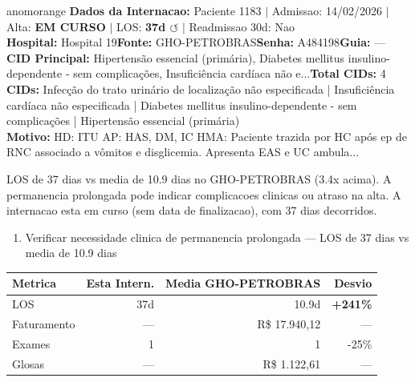 \documentclass[a4paper,10pt]{article}
\begin{document}
\begin{anomalycard}[Internacao 165684 | GHO-PETROBRAS | ALTO (z=4.22)]{anomorange}
\textbf{Dados da Internacao:} Paciente 1183 $\mid$ Admissao: 14/02/2026 $\mid$ Alta: \textcolor{anomorange}{\textbf{EM CURSO}} $\mid$ LOS: \textbf{37d \textcolor{anomorange}{$\circlearrowleft$}} $\mid$ Readmissao 30d: Nao\\
\textbf{Hospital:} Hospital 19\quad\textbf{Fonte:} GHO-PETROBRAS\quad\textbf{Senha:} A484198\quad\textbf{Guia:} ---\\
\textbf{CID Principal:} {\small Hipertensão essencial (primária), Diabetes mellitus insulino-dependente - sem complicações, Insuficiência cardíaca não e...}\quad\textbf{Total CIDs:} 4\\

\textbf{CIDs:} {\scriptsize Infecção do trato urinário de localização não especificada | Insuficiência cardíaca não especificada | Diabetes mellitus insulino-dependente - sem complicações | Hipertensão essencial (primária)}\\

\textbf{Motivo:} {\scriptsize HD: ITU AP: HAS, DM, IC HMA: Paciente trazida por HC após ep de RNC associado a vômitos e disglicemia. Apresenta EAS e UC ambula...}\\

\vspace{2pt}\begin{tcolorbox}[colback=severityred!20,colframe=anomorange,title={\textbf{Interpretacao de Negocio}},fonttitle=\bfseries\small,left=4pt,right=4pt,top=3pt,bottom=3pt]
{\small LOS de 37 dias vs media de 10.9 dias no GHO-PETROBRAS (3.4x acima). A permanencia prolongada pode indicar complicacoes clinicas ou atraso na alta. A internacao esta em curso (sem data de finalizacao), com 37 dias decorridos.}
\end{tcolorbox}
\begin{tcolorbox}[colback=severityyellow!30,colframe=anomorange,title={\textbf{Recomendacoes Especificas}},fonttitle=\bfseries\small,left=4pt,right=4pt,top=3pt,bottom=3pt]
\begin{enumerate}[nosep,leftmargin=16pt]
\item {\small Verificar necessidade clinica de permanencia prolongada --- LOS de 37 dias vs media de 10.9 dias}
\end{enumerate}
\end{tcolorbox}
\begin{center}\begin{tabular}{l r r r}\toprule\textbf{Metrica} & \textbf{Esta Intern.} & \textbf{Media GHO-PETROBRAS} & \textbf{Desvio} \\\midrule
LOS & 37d & 10.9d & \textcolor{anomred}{\textbf{+241\%}} \\
Faturamento & --- & R\$ 17.940,12 & --- \\
Exames & 1 & 1 & -25\% \\
Glosas & --- & R\$ 1.122,61 & --- \\
\bottomrule\end{tabular}\end{center}


\end{anomalycard}
\end{document}

